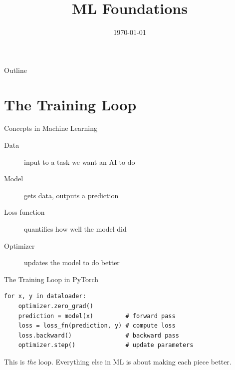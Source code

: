 \documentclass[aspectratio=169]{beamer}
\title{ML Foundations}
\subtitle{\coursetitle}
\author{\instructor}
\date{\today}
\begin{document}
\begin{frame}
\titlepage
\end{frame}

\begin{frame}{Outline}
\tableofcontents
\end{frame}

\section{The Training Loop}

\begin{frame}{Concepts in Machine Learning}
\begin{center}
\end{center}
\vspace{-0.3em}
\begin{description}
\item[Data] input to a task we want an AI to do
\item[Model] gets data, outputs a prediction
\item[Loss function] quantifies how well the model did
\item[Optimizer] updates the model to do better
\end{description}
\end{frame}

\begin{frame}[fragile]{The Training Loop in PyTorch}
\begin{verbatim}
for x, y in dataloader:
    optimizer.zero_grad()
    prediction = model(x)         # forward pass
    loss = loss_fn(prediction, y) # compute loss
    loss.backward()               # backward pass
    optimizer.step()              # update parameters
\end{verbatim}
\vspace{1em}
This is \emph{the} loop.
Everything else in ML is about making each piece better.
\end{frame}
\end{document}
